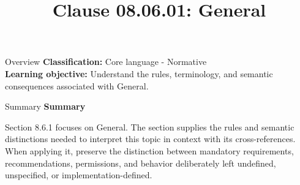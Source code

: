 \documentclass[10pt,letterpaper]{article}
\title{Clause 08.06.01: General}
\author{}
\date{}
\begin{document}
\maketitle
\begin{CornellOverviewBox}{Overview}
\textbf{Classification:} Core language - Normative\\[2pt]
\textbf{Learning objective:} Understand the rules, terminology, and semantic consequences associated with General.
\end{CornellOverviewBox}\begin{CornellSummaryBox}{Summary}
{\sffamily\bfseries\color{Accent} Summary}\par\vspace{3pt}Section 8.6.1 focuses on General. The section supplies the rules and semantic distinctions needed to interpret this topic in context with its cross-references. When applying it, preserve the distinction between mandatory requirements, recommendations, permissions, and behavior deliberately left undefined, unspecified, or implementation-defined.
\end{CornellSummaryBox}
\end{document}
